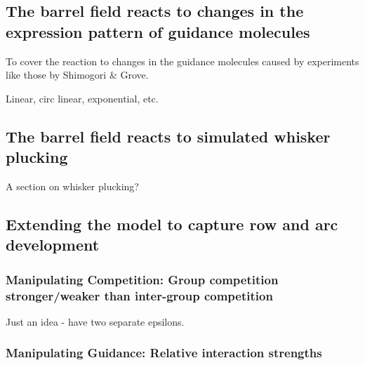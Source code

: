 \documentclass[a4paper,11pt]{article}
\begin{document}
\subsection*{The barrel field reacts to changes in the expression pattern of guidance molecules}

To cover the reaction to changes in the guidance molecules caused by
experiments like those by Shimogori \& Grove.

Linear, circ linear, exponential, etc.

\subsection*{The barrel field reacts to simulated whisker plucking}

A section on whisker plucking?




\subsection*{Extending the model to capture row and arc development}

\subsubsection*{Manipulating Competition: Group competition stronger/weaker than inter-group competition}

Just an idea - have two separate epsilons.

\subsubsection*{Manipulating Guidance: Relative interaction strengths}
\end{document}
